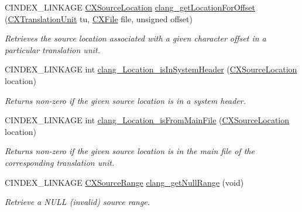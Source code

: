 \begin{DoxyCompactItemize}
C\+I\+N\+D\+E\+X\+\_\+\+L\+I\+N\+K\+A\+GE \hyperlink{structCXSourceLocation}{C\+X\+Source\+Location} \hyperlink{group__CINDEX__LOCATIONS_gab6f5b1cc0761131ccfd1dc8cdca1f6d8}{clang\+\_\+get\+Location\+For\+Offset} (\hyperlink{group__CINDEX_gacdb7815736ca709ce9a5e1ec2b7e16ac}{C\+X\+Translation\+Unit} tu, \hyperlink{group__CINDEX__FILES_gacfcea9c1239c916597e2e5b3e109215a}{C\+X\+File} file, unsigned offset)
\begin{DoxyCompactList}\small\item\em Retrieves the source location associated with a given character offset in a particular translation unit. \end{DoxyCompactList}\item 
\mbox{\label{group__CINDEX__LOCATIONS_ga6bff8dbc149f24f388d8b960e99222a1}} 
C\+I\+N\+D\+E\+X\+\_\+\+L\+I\+N\+K\+A\+GE int \hyperlink{group__CINDEX__LOCATIONS_ga6bff8dbc149f24f388d8b960e99222a1}{clang\+\_\+\+Location\+\_\+is\+In\+System\+Header} (\hyperlink{structCXSourceLocation}{C\+X\+Source\+Location} location)
\begin{DoxyCompactList}\small\item\em Returns non-\/zero if the given source location is in a system header. \end{DoxyCompactList}\item 
\mbox{\label{group__CINDEX__LOCATIONS_gacb4ca7b858d66f0205797ae84cc4e8f2}} 
C\+I\+N\+D\+E\+X\+\_\+\+L\+I\+N\+K\+A\+GE int \hyperlink{group__CINDEX__LOCATIONS_gacb4ca7b858d66f0205797ae84cc4e8f2}{clang\+\_\+\+Location\+\_\+is\+From\+Main\+File} (\hyperlink{structCXSourceLocation}{C\+X\+Source\+Location} location)
\begin{DoxyCompactList}\small\item\em Returns non-\/zero if the given source location is in the main file of the corresponding translation unit. \end{DoxyCompactList}\item 
\mbox{\label{group__CINDEX__LOCATIONS_gafcb849f2f038466f46397d552e736da3}} 
C\+I\+N\+D\+E\+X\+\_\+\+L\+I\+N\+K\+A\+GE \hyperlink{structCXSourceRange}{C\+X\+Source\+Range} \hyperlink{group__CINDEX__LOCATIONS_gafcb849f2f038466f46397d552e736da3}{clang\+\_\+get\+Null\+Range} (void)
\begin{DoxyCompactList}\small\item\em Retrieve a N\+U\+LL (invalid) source range. \end{DoxyCompactList}\item 

\end{DoxyCompactItemize}
